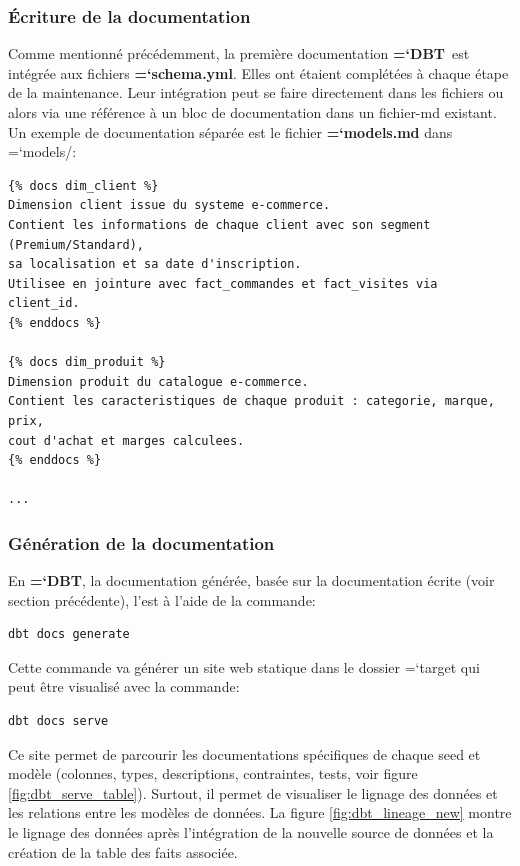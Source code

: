 \documentclass[11pt]{article}
\newcommand{\techno}[1]{{\ttfamily\bfseries\hyphenchar\font=`\-\color{Sienna}#1}}
\newcommand{\fichier}[1]{\colorbox{backcolor}{\ttfamily\bfseries\hyphenchar\font=`\-\color{filecolor}#1}}
\newcommand{\folder}[1]{\colorbox{backcolor}{\ttfamily\hyphenchar\font=`\-\color{FireBrick}#1}}
\newcommand{\dbt}{\techno{DBT}}
\begin{document}
\subsubsection{Écriture de la documentation}

Comme mentionné précédemment, la première documentation \dbt\ est intégrée aux fichiers \fichier{schema.yml}. Elles ont étaient complétées à chaque étape de la maintenance. Leur intégration peut se faire directement dans les fichiers ou alors via une référence à un bloc de documentation dans un fichier-md existant. Un exemple de documentation séparée est le fichier \fichier{models.md}
dans \folder{models/}:
\begin{lstlisting}[]
{% docs dim_client %}
Dimension client issue du systeme e-commerce.
Contient les informations de chaque client avec son segment (Premium/Standard),
sa localisation et sa date d'inscription.
Utilisee en jointure avec fact_commandes et fact_visites via client_id.
{% enddocs %}

{% docs dim_produit %}
Dimension produit du catalogue e-commerce.
Contient les caracteristiques de chaque produit : categorie, marque, prix,
cout d'achat et marges calculees.
{% enddocs %}

...
\end{lstlisting}

\subsubsection{Génération de la documentation}

En \dbt, la documentation générée, basée sur la documentation écrite (voir section
précédente), l'est à l'aide de la commande:
\begin{lstlisting}[language=bash]
dbt docs generate
\end{lstlisting}
Cette commande va générer un site web statique dans le dossier \folder{target} qui peut être visualisé avec la commande:
\begin{lstlisting}[language=bash]
dbt docs serve
\end{lstlisting}
Ce site permet de parcourir les documentations spécifiques de chaque
seed et modèle (colonnes, types, descriptions, contraintes, tests, voir figure \ref{fig:dbt_serve_table}).
Surtout, il permet de visualiser le lignage des données et les relations entre les modèles de données. La figure \ref{fig:dbt_lineage_new} montre le lignage des données après l'intégration de la nouvelle source de données et la création de la table des faits associée.
\end{document}
